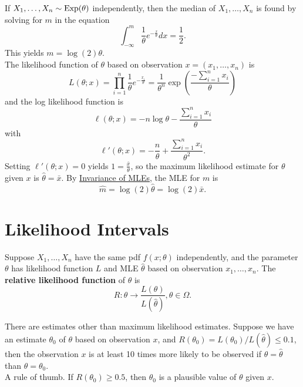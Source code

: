 \documentclass[11pt,fleqn]{book} %
\begin{document}
\begin{example} \label{eg:543}
If \(X_1, \ldots, X_n \sim \operatorname{Exp}(\theta)\) independently, then the median of \(X_1, \ldots, X_n\) is found by solving for \(m\) in the equation
\[
\int_{-\infty}^m\frac1\theta e^{-\frac{x}{\theta}}dx = \frac12.
\]
\indent This yields \(m = \log(2)\theta\).\\
\indent The likelihood function of \(\theta\) based on observation \(x = (x_1, \ldots, x_n)\) is
\[
L(\theta; x) = \prod_{i=1}^n\frac1\theta e^{-\frac{x_i}{\theta}} = \frac1{\theta^n}\exp\left(\frac{-\sum_{i=1}^n x_i}{\theta}\right)
\]
and the log likelihood function is
\[
\ell(\theta; x) = -n\log\theta - \frac{\sum_{i=1}^n x_i}{\theta}
\]
with
\[
\ell'(\theta;x) = -\frac{n}{\theta} + \frac{\sum_{i=1}^nx_i}{\theta^2}.
\]
\indent Setting \(\ell'(\theta; x) = 0\) yields \(1 = \frac{\bar{x}}{\theta}\), so the maximum likelihood estimate for \(\theta\) given \(x\) is \(\hat{\theta} = \bar{x}\). By \hyperref[thm:542]{Invariance of MLEs}, the MLE for \(m\) is
\[
\hat{m} = \log(2)\hat{\theta} = \log(2)\bar{x}.
\]
\end{example}


\section{Likelihood Intervals}

\begin{definition} \label{def:551}
Suppose \(X_1, \ldots, X_n\) have the same pdf \(f(x; \theta)\) independently, and the parameter \(\theta\) has likelihood function \(L\) and MLE \(\hat{\theta}\) based on observation \(x_1, \ldots, x_n\). The \textbf{relative likelihood function} of \(\theta\) is
\[
R: \theta \rightarrow \frac{L(\theta)}{L(\hat{\theta})}, \theta \in \Omega.
\]
\end{definition}

\begin{remark} \label{rmk:552}
There are estimates other than maximum likelihood estimates. Suppose we have an estimate \(\theta_0\) of \(\theta\) based on observation \(x\), and \(R(\theta_0) = L(\theta_0)/L(\hat{\theta}) \leq 0.1\), then the observation \(x\) is at least 10 times more likely to be observed if \(\theta = \hat{\theta}\) than \(\theta = \theta_0\).\\
\indent A rule of thumb. If \(R(\theta_0) \geq 0.5\), then \(\theta_0\) is a plausible value of \(\theta\) given \(x\).
\end{remark}
\end{document}
